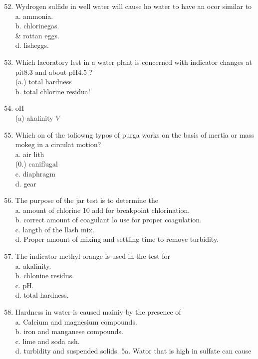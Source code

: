 \documentclass[10pt]{article}
\begin{document}
\begin{enumerate}
  \setcounter{enumi}{51}
  \item Wydrogen sulfide in well water will cause ho water to have an ocor similar to\\
a. ammonia.\\
b. chlorinegas.\\
\& rottan eggs.\\
d. lisheggs.

  \item Which lacoratory lest in a water plant is concerned with indicator changes at $\mathrm{pit} 8.3$ and about $\mathrm{pH} 4.5$ ?\\
(a.) total hardness\\
b. total chlorine residua!

  \item $\mathrm{oH}$\\
(a) akalinity $V$

  \item Which on of the toliowng typos of purga works on the basis of mertia or mass mokeg in a circulat motion?\\
a. air lith\\
(0.) canifíugal\\
c. diaphragm\\
d. gear

  \item The purpose of the jar test is to determine the\\
a. amount of chlorine 10 add for breakpoint chlorination.\\
b. correct amount of coagulant lo use for proper coagulation.\\
c. langth of the llash mix.\\
d. Proper amount of mixing and settling time to remove turbidity.

  \item The indicator methyl orange is used in the test for\\
a. akalinity.\\
b. chlonine residus.\\
c. pH.\\
d. total hardness.

  \item Hardness in water is caused mainiy by the presence of\\
a. Calcium and magnesium compounds.\\
b. iron and manganese compounds.\\
c. lime and soda ash.\\
d. turbidity and suspended solids. 5a. Wator that is high in sulfate can cause

\end{enumerate}
\end{document}

